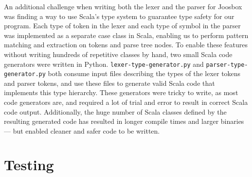 \documentclass[letterpaper]{article}
\begin{document}

  An additional challenge when writing both the lexer and the parser for
  Joosbox was finding a way to use Scala's type system to guarantee type
  safety for our program. Each type of token in the lexer and each type of
  symbol in the parser was implemented as a separate case class in Scala,
  enabling us to perform pattern matching and extraction on tokens and parse
  tree nodes. To enable these features without writing hundreds of repetitive
  classes by hand, two small Scala code generators were written in Python.
  {\tt lexer-type-generator.py} and {\tt parser-type-generator.py} both
  consume input files describing the types of the lexer tokens and parser
  tokens, and use these files to generate valid Scala code that implements
  this type hierarchy. These generators were tricky to write, as most code
  generators are, and required a lot of trial and error to result in correct
  Scala code output. Additionally, the huge number of Scala classes defined by
  the resulting generated code has resulted in longer compile times and larger
  binaries --- but enabled cleaner and safer code to be written.

  \section{Testing}

\end{document}
